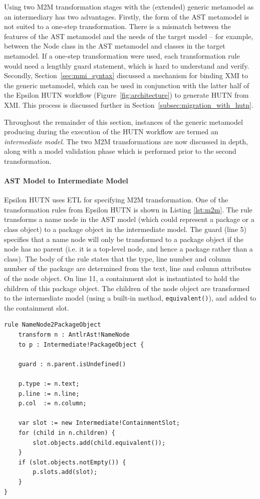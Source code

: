 Using two M2M transformation stages with the (extended) generic metamodel as an intermediary has two advantages. Firstly, the form of the AST metamodel is not suited to a one-step transformation. There is a mismatch between the features of the AST metamodel and the needs of the target model -- for example, between the Node class in the AST metamodel and classes in the target metamodel. If a one-step transformation were used, each transformation rule would need a lengthly guard statement, which is hard to understand and verify. Secondly, Section~\ref{sec:mmi_syntax} discussed a mechanism for binding XMI to the generic metamodel, which can be used in conjunction with the latter half of the Epsilon HUTN workflow (Figure~\ref{fig:architecture}) to generate HUTN from XMI. This process is discussed further in Section~\ref{subsec:migration_with_hutn}.

Throughout the remainder of this section, instances of the generic metamodel producing during the execution of the HUTN workflow are termed an \textit{intermediate model}. The two M2M transformations are now discussed in depth, along with a model validation phase which is performed prior to the second transformation.

\paragraph{AST Model to Intermediate Model}
Epsilon HUTN uses ETL for specifying M2M transformation. One of the transformation rules from Epsilon HUTN is shown in Listing \ref{lst:m2m}. The rule transforms a name node in the AST model (which could represent a package or a class object) to a package object in the intermediate model. The guard (line 5) specifies that a name node will only be transformed to a package object if the node has no parent (i.e. it is a top-level node, and hence a package rather than a class). The body of the rule states that the type, line number and column number of the package are determined from the text, line and column attributes of the node object. On line 11, a containment slot is instantiated to hold the children of this package object. The children of the node object are transformed to the intermediate model (using a built-in method, \verb|equivalent()|), and added to the containment slot.

\begin{lstlisting}[caption=Transformation rule (in ETL) to convert AST nodes to package objects., label=lst:m2m, language=ETL]
rule NameNode2PackageObject
    transform n : AntlrAst!NameNode
    to p : Intermediate!PackageObject {

    guard : n.parent.isUndefined()

    p.type := n.text;
    p.line := n.line;
    p.col  := n.column;

    var slot := new Intermediate!ContainmentSlot;
    for (child in n.children) {
        slot.objects.add(child.equivalent());
    }
    if (slot.objects.notEmpty()) {
        p.slots.add(slot);
    }
}
\end{lstlisting}

